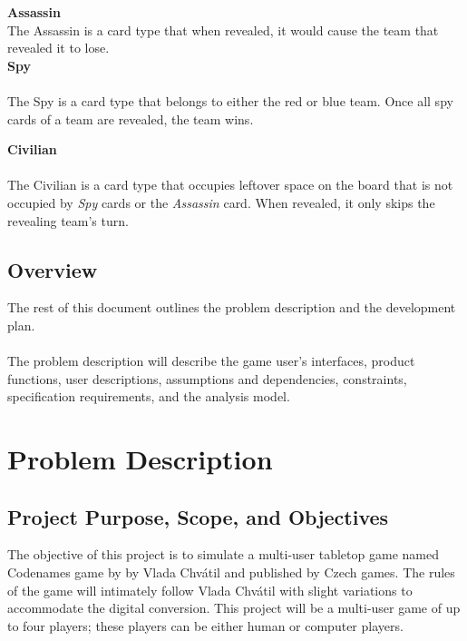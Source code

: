 \documentclass[10pt, a4paper]{article}
\begin{document}
		\textbf{Assassin} \\
		The Assassin is a card type that when revealed, it would cause the team that revealed it to lose.\\
		
		\textbf{Spy}\\
		\\
		The Spy is a card type that belongs to either the red or blue team. Once all spy cards of a team are revealed, the team wins.
		
		\textbf{Civilian}\\
		\\
		The Civilian is a card type that occupies leftover space on the board that is not occupied by \textit{Spy} cards or the \textit{Assassin} card. When revealed, it only skips the revealing team's turn. \\
	
	
	\subsection{Overview}
	
	The rest of this document outlines the problem description and the development plan. \\ 
	\\  
	The problem description will describe the game user's interfaces, product functions, user descriptions, assumptions and dependencies, constraints, specification requirements, and the analysis model. \\  
	
	\clearpage
	
\section{Problem Description}

	\subsection{Project Purpose, Scope, and Objectives}
	
	The objective of this project is to simulate a multi-user tabletop game named Codenames game by by Vlada Chv\'atil and published by Czech games. The rules of the game will intimately follow Vlada Chv\'atil with slight variations to accommodate the digital conversion. This project will be a multi-user game of up to four players; these players can be either human or computer players.\\
	
\end{document}
